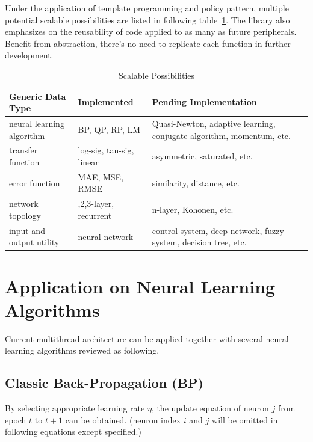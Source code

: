\documentclass[procedia]{easychair}
\begin{document}
Under the application of template programming and policy pattern, multiple potential scalable possibilities are listed in following table~\ref{table:scalability}.  The library also emphasizes on the reusability of code applied to as many as future peripherals.  Benefit from abstraction, there’s no need to replicate each function in further development.

\begin{table}[htp]
    \centering
    \caption{Scalable Possibilities}
    \begin{tabular}{ >{\centering}m{4cm} >{\centering}m{3.5cm} >{\centering\arraybackslash}m{4.5cm} }
        \hline \hline
        Generic Data Type & Implemented & Pending Implementation \\
        \hline
        neural learning algorithm & BP, QP, RP, LM & Quasi-Newton, adaptive learning, conjugate algorithm, momentum, etc. \\
        \hline
        transfer function & log-sig, tan-sig, linear & asymmetric, saturated, etc. \\
        \hline
        error function & MAE, MSE, RMSE & similarity, distance, etc. \\
        \hline
        network topology & 1,2,3-layer, recurrent & n-layer, Kohonen, etc. \\
        \hline
        input and output utility & neural network & control system, deep network, fuzzy system, decision tree, etc. \\
        \hline \hline
    \end{tabular}
    \label{table:scalability}
\end{table}


\section{Application on Neural Learning Algorithms}

Current multithread architecture can be applied together with several neural learning algorithms reviewed as following.

\subsection{Classic Back-Propagation (BP)}

By selecting appropriate learning rate $\eta$, the update equation of neuron $j$ from epoch $t$ to $t + 1$ can be obtained.  (neuron index $i$ and $j$ will be omitted in following equations except specified.)
\end{document}
